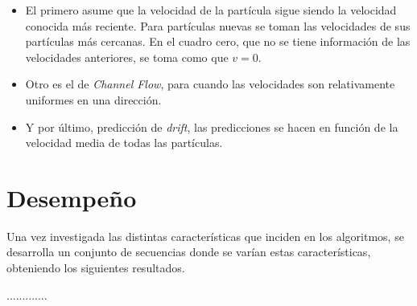 \begin{itemize}
    \item El primero asume que la velocidad de la partícula sigue siendo la velocidad conocida más reciente. Para partículas nuevas se toman las velocidades de sus partículas más cercanas. En el cuadro cero, que no se tiene información de las velocidades anteriores, se toma como que $v = 0$.
    \item Otro es el de \textit{Channel Flow}, para cuando las velocidades son relativamente uniformes en una dirección.
    \item Y por último, predicción de \textit{drift}, las predicciones se hacen en función de la velocidad media de todas las partículas.
\end{itemize}


\section{Desempeño}
Una vez investigada las distintas características que inciden en los algoritmos, se desarrolla un conjunto de secuencias donde se varían estas características, obteniendo los siguientes resultados. 

.............